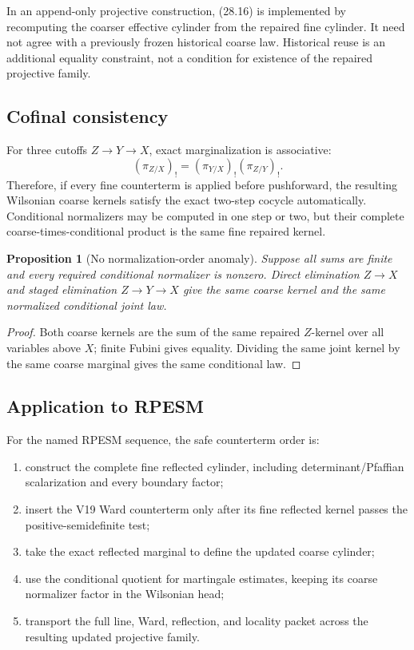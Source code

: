 \documentclass[11pt]{article}
\newtheorem{proposition}[theorem]{Proposition}
\theoremstyle{remark}
\begin{document}
In an append-only projective construction, (28.16) is implemented by
recomputing the coarser effective cylinder from the repaired fine
cylinder.  It need not agree with a previously frozen historical
coarse law.  Historical reuse is an additional equality constraint,
not a condition for existence of the repaired projective family.

\subsection{Cofinal consistency}

For three cutoffs \(Z\to Y\to X\), exact marginalization is
associative:
\[
                         (\pi_{Z/X})_!
 =
 (\pi_{Y/X})_!(\pi_{Z/Y})_!.                               \tag{28.17}
\]
Therefore, if every fine counterterm is applied before pushforward,
the resulting Wilsonian coarse kernels satisfy the exact two-step
cocycle automatically.  Conditional normalizers may be computed in
one step or two, but their complete coarse-times-conditional product
is the same fine repaired kernel.

\begin{proposition}[No normalization-order anomaly]
\label{prop:v12v28-associative}
Suppose all sums are finite and every required conditional
normalizer is nonzero.  Direct elimination \(Z\to X\) and staged
elimination \(Z\to Y\to X\) give the same coarse kernel and the same
normalized conditional joint law.
\end{proposition}

\begin{proof}
Both coarse kernels are the sum of the same repaired \(Z\)-kernel
over all variables above \(X\); finite Fubini gives equality.
Dividing the same joint kernel by the same coarse marginal gives the
same conditional law.
\end{proof}

\subsection{Application to RPESM}

For the named RPESM sequence, the safe counterterm order is:

\begin{enumerate}
\item construct the complete fine reflected cylinder, including
      determinant/Pfaffian scalarization and every boundary factor;
\item insert the V19 Ward counterterm only after its fine reflected
      kernel passes the positive-semidefinite test;
\item take the exact reflected marginal to define the updated coarse
      cylinder;
\item use the conditional quotient for martingale estimates, keeping
      its coarse normalizer factor in the Wilsonian head;
\item transport the full line, Ward, reflection, and locality packet
      across the resulting updated projective family.
\end{enumerate}
\end{document}
